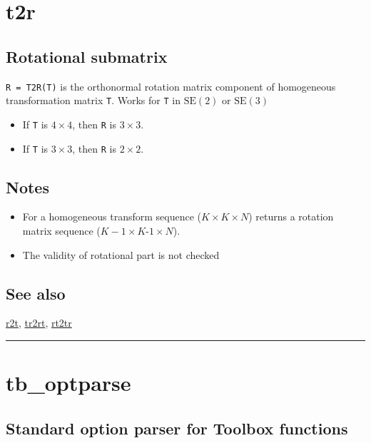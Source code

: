 \hypertarget{t2r}{\section*{t2r}}
\subsection*{Rotational submatrix}


\texttt{R = T2R(T)} is the orthonormal rotation matrix component of homogeneous
transformation matrix \texttt{T}.  Works for \texttt{T} in $\mbox{SE}(2)$ or $\mbox{SE}(3)$

\begin{itemize}
  \item If \texttt{T} is $4 \times 4$, then \texttt{R} is $3 \times 3$.
  \item If \texttt{T} is $3 \times 3$, then \texttt{R} is $2 \times 2$.
\end{itemize}

\subsection*{Notes}
\begin{itemize}
  \item For a homogeneous transform sequence ($K \times K \times N$) returns a rotation matrix    sequence ($K-1 \times K$-$1 \times N$).
  \item The validity of rotational part is not checked
\end{itemize}

\subsection*{See also}


\hyperlink{r2t}{\color{blue} r2t}, \hyperlink{tr2rt}{\color{blue} tr2rt}, \hyperlink{rt2tr}{\color{blue} rt2tr}

\vspace{1.5ex}\rule{\textwidth}{1mm}

\hypertarget{tb\_optparse}{\section*{tb\_optparse}}
\subsection*{Standard option parser for Toolbox functions}


